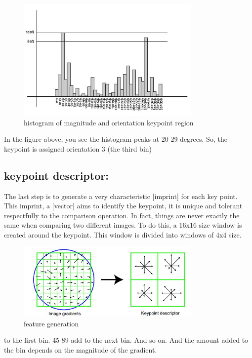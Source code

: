 \begin{figure}[H]
\centering
\includegraphics[width=0.8\textwidth]{img/sift_histogram.jpg}
\caption{histogram of magnitude and orientation keypoint region}
\label{fig:histogram}
\end{figure}



In the figure above, you see the histogram peaks at 20-29 degrees. So, the keypoint is assigned orientation 3 (the third bin)

\subsection{keypoint descriptor:}
The last step is to generate a very characteristic [imprint] for each key point. This imprint, a [vector] aims to identify the keypoint, it is unique and tolerant respectfully to the comparison operation. In fact, things are never exactly the same when comparing two different images.
To do this, a 16x16 size window is created around the keypoint. This window is divided into windows of 4x4 size.

\begin{figure}[H]
\centering
\includegraphics[width=0.8\textwidth]{img/sift4.jpg}
\caption{feature generation}
\label{fig:feature}
\end{figure}


to the first bin. 45-89 add to the next bin. And so on. And the amount added to the bin depends on the magnitude of the gradient. 

